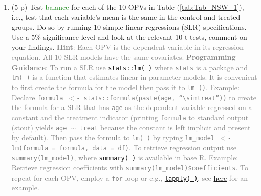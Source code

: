 \documentclass{article}
\begin{document}
\begin{enumerate}[label=\textbf{Q\arabic{enumi}}.,ref=Q\arabic{enumi}, wide=0pt, itemsep=1em, topsep=5pt]
\item (5 p) Test \textcolor{ForestGreen}{balance} for each of the 10 OPVs in Table (\ref{tab:Tab_NSW_1}), i.e.,  test that each variable's mean is the same in the control and treated groups. Do so by running 10 simple linear regressions (SLR) specifications. Use a 5\% significance level and look at the relevant 10 t-tests, comment on your findings. \textcolor{gray}{\textbf{Hint}: Each OPV is the dependent variable in its regression equation. All 10 SLR models have the same covariates. \textbf{Programming Guidance}: To run a SLR use \href{https://www.rdocumentation.org/packages/stats/versions/3.6.2/topics/lm}{\texttt{stats::lm( )}} where \texttt{stats} is a package and \texttt{lm( )} is a function that estimates linear-in-parameter models. It is convenient to first create the formula for the model then pass it to \texttt{lm ()}. Example: Declare \texttt{formula $<$- stats::formula(paste(age, ``$\sim$treat''))} to create the formula for a SLR that has \texttt{age} as the dependent variable regressed on a constant and the treatment indicator (printing \texttt{formula} to standard output (stout) yields \texttt{age $\sim$ treat} because the constant is left implicit and present by default). Then pass the formula to \texttt{lm( )} by typing \texttt{lm\_model $<$- lm(formula = formula, data = df)}. To retrieve regression output use \texttt{summary(lm\_model)}, where \href{https://www.rdocumentation.org/packages/base/versions/3.6.2/topics/summary}{\texttt{summary( )}} is available in base R. Example: Retrieve regression coefficients with \texttt{summary(lm\_model)\$coefficients}. To repeat for each OPV, employ a \texttt{for} loop or e.g., \href{https://www.rdocumentation.org/packages/base/versions/3.6.2/topics/lapply}{\texttt{lapply( )}}, see \href{https://www.statology.org/r-loop-through-data-frame-columns/}{here} for an example.}\label{item:balance_test:single_tests} 


\end{enumerate}
\end{document}
